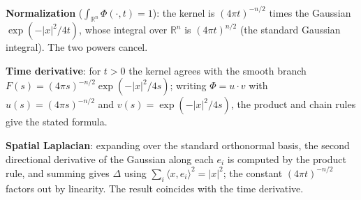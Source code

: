 ﻿\documentclass[12pt, a4paper]{article}
\renewcommand{\_}{\origunderscore\allowbreak}
\theoremstyle{definition}
\theoremstyle{plain}
\begin{document}
\textbf{Normalization} ($\int_{\mathbb{R}^n} \Phi(\cdot, t) = 1$): the kernel is
$(4\pi t)^{-n/2}$ times the Gaussian $\exp(-|x|^2/4t)$, whose integral over $\mathbb{R}^n$ is
$(4\pi t)^{n/2}$ (the standard Gaussian integral). The two powers cancel.

\textbf{Time derivative}: for $t > 0$ the kernel agrees with the smooth branch
$F(s) = (4\pi s)^{-n/2} \exp(-|x|^2/4s)$; writing $\Phi = u\cdot v$ with
$u(s) = (4\pi s)^{-n/2}$ and $v(s) = \exp(-|x|^2/4s)$, the product and chain rules give the
stated formula.

\textbf{Spatial Laplacian}: expanding over the standard orthonormal basis, the second
directional derivative of the Gaussian along each $e_i$ is computed by the product rule, and
summing gives $\Delta$ using $\sum_i \langle x, e_i\rangle^2 = |x|^2$; the constant
$(4\pi t)^{-n/2}$ factors out by linearity. The result coincides with the time derivative.
\end{document}

